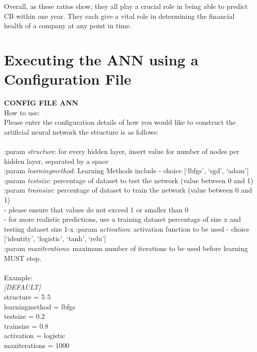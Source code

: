 \documentclass[11pt]{article}
\begin{document}
Overall, as these ratios show, they all play a crucial role in being able to predict CB within one year. They each give a vital role in determining the financial health of a company at any point in time. 

\newpage
\section{Executing the ANN using a Configuration File}

\textbf{CONFIG FILE ANN}\\
How to use:\\
Please enter the configuration details of how you would like to construct the artificial neural network the structure is as follows:\\
\\
   :param \textit{structure}: for every hidden layer, insert value for number of nodes per hidden layer, separated by a space\\
   :param \textit{learning\textunderscore method}: Learning Methods include - choice {[`lbfgs', `sgd', `adam']}\\
   :param \textit{test\textunderscore size}: percentage of dataset to test the network (value between 0 and 1)\\
   :param \textit{train\textunderscore size}: percentage of dataset to train the network (value between 0 and 1)\\
   -  please ensure that values do not exceed 1 or smaller than 0\\
   -  for more realistic predictions, use a training dataset percentage of size x and testing dataset size 1-x
   :param \textit{activation}: activation function to be used - choice {[`identity', `logistic', `tanh', `relu']}\\
   :param \textit{max\textunderscore iterations}: maximum number of iterations to be used before learning MUST stop.\\
\\
Example:\\
\textit{[DEFAULT] }\\
structure =  5 5 \\
learning\textunderscore method = lbfgs \\
test\textunderscore size = 0.2 \\
train\textunderscore size = 0.8 \\
activation = logistic \\
max\textunderscore iterations = 1000 \\
\end{document}
